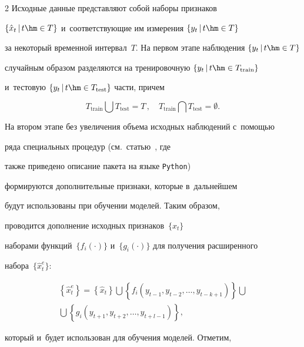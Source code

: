 \begin{multicols}{2}
Исходные данные представляют собой наборы признаков 

$\{\hat{x}_t\,|\,t \hm\in T\}$ и~соответствующие им измерения $\{y_t\,|\,t \hm\in T\}$ 

за некоторый временной интервал~$T$. На первом этапе наблюдения $\{y_t\,|\,t\hm \in T\}$ 

случайным образом разделяются на тренировочную $\{y_t\,|\,t \hm\in T_{\mathrm{train}}\}$ 

и~тестовую $\{y_t\,|\,t \hm\in T_{\mathrm{test}}\}$ части, причем 

\begin{equation*}

T_{\mathrm{train}} \bigcup T_{\mathrm{test}} = T\,, \quad T_{\mathrm{train}} 

\bigcap T_{\mathrm{test}} = \emptyset.

\end{equation*}



На втором этапе без увеличения объема исходных наблюдений с~помощью 

ряда специальных процедур (см.\ статью~\cite{Christ2018}, где 

также приведено описание пакета на языке \verb"Python") 

формируются дополнительные признаки, которые в~дальнейшем 

будут использованы при обучении моделей. Таким образом, 

проводится дополнение исходных признаков~$\{\hat{x}_t\}$ 

наборами функций~$\{f_i(\cdot)\}$ и~$\{g_i(\cdot)\}$ для получения расширенного 

набора~$\{\hat{x}^e_t\}$:

\begin{multline}

\label{eXtend}

\left\{\hat{x}^e_t\right\} =\left\{\hat{x}_t\right\}\bigcup 

\left\{ f_i\left(y_{t-1}, y_{t-2}, \ldots, y_{t-k+1}\right) \right\} \bigcup{}\\

{}\bigcup

\left\{ g_i\left(y_{t+1}, y_{t+2}, \ldots, y_{t+l-1}\right)\right \},

\end{multline}

который и~будет использован для обучения моделей. Отметим, 


\end{multicols}
